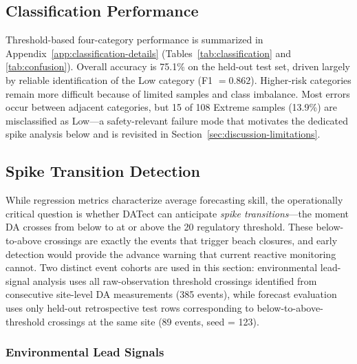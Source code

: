 \documentclass[toxins,article,submit,moreauthors]{Definitions/mdpi}
\begin{document}
\subsection{Classification Performance}
\label{sec:results-classification}

Threshold-based four-category performance is summarized in Appendix~\ref{app:classification-details} (Tables~\ref{tab:classification} and \ref{tab:confusion}). Overall accuracy is 75.1\% on the held-out test set, driven largely by reliable identification of the Low category (F1 $= 0.862$). Higher-risk categories remain more difficult because of limited samples and class imbalance. Most errors occur between adjacent categories, but 15 of 108 Extreme samples (13.9\%) are misclassified as Low---a safety-relevant failure mode that motivates the dedicated spike analysis below and is revisited in Section~\ref{sec:discussion-limitations}.

\subsection{Spike Transition Detection}
\label{sec:results-spike}

While regression metrics characterize average forecasting skill, the operationally critical question is whether DATect can anticipate \emph{spike transitions}---the moment DA crosses from below to at or above the \SI{20}{\microgrampeg} regulatory threshold. These below-to-above crossings are exactly the events that trigger beach closures, and early detection would provide the advance warning that current reactive monitoring cannot. Two distinct event cohorts are used in this section: environmental lead-signal analysis uses all raw-observation threshold crossings identified from consecutive site-level DA measurements (385 events), while forecast evaluation uses only held-out retrospective test rows corresponding to below-to-above-threshold crossings at the same site (89 events, seed = 123).

\subsubsection{Environmental Lead Signals}
\label{sec:results-env-lead}
\end{document}
